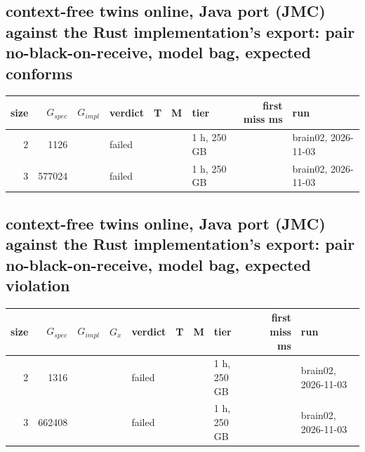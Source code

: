 \documentclass[10pt]{article}
\begin{document}
\subsection*{context-free twins online, Java port (JMC) against the Rust implementation's export: pair \textsf{no-black-on-receive}, model bag, expected conforms}
\begin{longtable}{@{}rrrlrrlrl@{}}
\toprule
size & $G_{\mathit{spec}}$ & $G_{\mathit{impl}}$ & verdict & T & M & tier & first miss ms & run \\
\midrule
\endhead
\color{blue} 2 & 1126 &  & failed &  &  & 1 h, 250 GB &  & brain02, 2026-11-03 \\
\color{blue} 3 & 577024 &  & failed &  &  & 1 h, 250 GB &  & brain02, 2026-11-03 \\
\bottomrule
\end{longtable}
\subsection*{context-free twins online, Java port (JMC) against the Rust implementation's export: pair \textsf{no-black-on-receive}, model bag, expected violation}
\begin{longtable}{@{}rrrrlrrlrl@{}}
\toprule
size & $G_{\mathit{spec}}$ & $G_{\mathit{impl}}$ & $G_x$ & verdict & T & M & tier & first miss ms & run \\
\midrule
\endhead
\color{blue} 2 & 1316 &  &  & failed &  &  & 1 h, 250 GB &  & brain02, 2026-11-03 \\
\color{blue} 3 & 662408 &  &  & failed &  &  & 1 h, 250 GB &  & brain02, 2026-11-03 \\
\bottomrule
\end{longtable}
\end{document}
